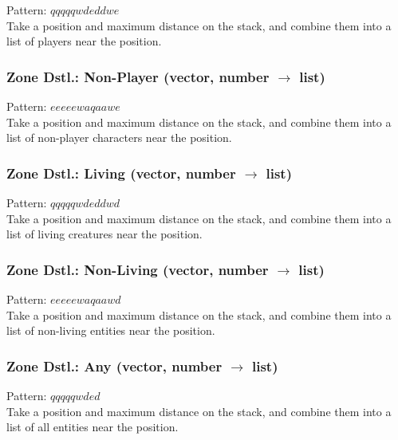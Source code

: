 \documentclass[12pt]{article}
\begin{document}
    Pattern: $qqqqqwdeddwe$\\
      Take a position and maximum distance on the stack, and combine them into a list of players near the position.\\


  \label{sec: patterns/entities@hexcasting:zone_entity/not_player}
\subsubsection*{Zone Dstl.: Non-Player (vector, number $\rightarrow$ list)}

    Pattern: $eeeeewaqaawe$\\
      Take a position and maximum distance on the stack, and combine them into a list of non-player characters near the position.\\


  \label{sec: patterns/entities@hexcasting:zone_entity/living}
\subsubsection*{Zone Dstl.: Living (vector, number $\rightarrow$ list)}

    Pattern: $qqqqqwdeddwd$\\
      Take a position and maximum distance on the stack, and combine them into a list of living creatures near the position.\\


  \label{sec: patterns/entities@hexcasting:zone_entity/not_living}
\subsubsection*{Zone Dstl.: Non-Living (vector, number $\rightarrow$ list)}

    Pattern: $eeeeewaqaawd$\\
      Take a position and maximum distance on the stack, and combine them into a list of non-living entities near the position.\\


  \label{sec: patterns/entities@hexcasting:zone_entity}
\subsubsection*{Zone Dstl.: Any (vector, number $\rightarrow$ list)}

    Pattern: $qqqqqwded$\\
      Take a position and maximum distance on the stack, and combine them into a list of all entities near the position.\\
\end{document}
